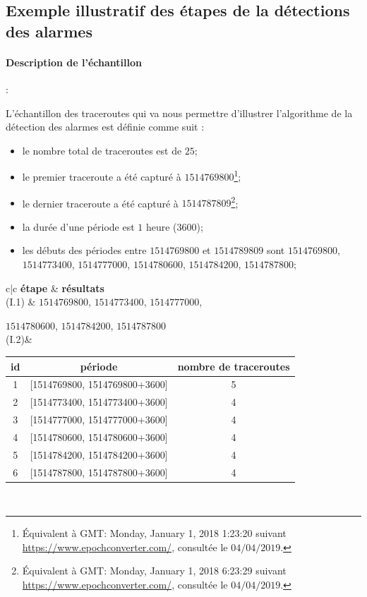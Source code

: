 \subsection{Exemple illustratif des étapes de la détections des alarmes}

\paragraph{Description de  l'échantillon} :

L'échantillon des traceroutes qui va nous permettre d'illustrer l'algorithme de la détection des alarmes est définie comme suit :

\begin{itemize}
	\item le nombre total de traceroutes est de $25$;
	\item le premier traceroute a été capturé à $1514769800$\footnote{Équivalent à GMT: Monday, January 1, 2018 1:23:20 suivant \url{https://www.epochconverter.com/}, consultée le $04/04/2019$.};
	\item le dernier traceroute a été capturé à $1514787809$\footnote{Équivalent à GMT: Monday, January 1, 2018 6:23:29 suivant \url{https://www.epochconverter.com/}, consultée le $04/04/2019$.};
	\item la durée d'une période est $1$ heure ($3600$);
	\item les débuts des périodes entre $ 1514769800 $ et $ 1514789809 $ sont  $ 1514769800 $, $ 1514773400 $, $ 1514777000 $, $ 1514780600 $, $ 1514784200 $, $ 1514787800 $;
\end{itemize} 




\begin{table}[H]
	\centering
	\begin{tabular}{c|c}
		\textbf{étape} &  \textbf{résultats}	\\ \hline
		(I.1) &   $ 1514769800 $, $ 1514773400 $, $ 1514777000 $,
		
		$ 1514780600 $, $ 1514784200 $, $ 1514787800 $\\ \hline
		(I.2)& 
		\begin{tabular}{ccc}
			\textbf{id}&	\textbf{période}&\textbf{nombre de traceroutes} \\ \hline
			1&	[1514769800, 1514769800+3600] & 5\\ \hline
			2&	[1514773400, 1514773400+3600] & 4\\ \hline
			3&	[1514777000, 1514777000+3600] & 4\\ \hline
			4&	[1514780600, 1514780600+3600] &4 \\ \hline
			5&	[1514784200, 1514784200+3600] &4 \\ \hline
			6&	[1514787800, 1514787800+3600] & 4 \\ \hline
		\end{tabular}\\ \hline
	\end{tabular}
\end{table}

